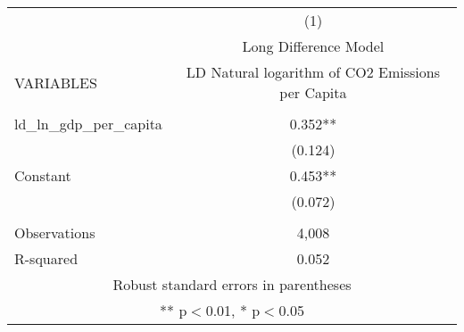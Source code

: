 \begin{tabular}{lc} \hline
 & (1) \\
 & Long Difference Model \\
VARIABLES & LD Natural logarithm of CO2 Emissions per Capita \\ \hline
 &  \\
ld\_ln\_gdp\_per\_capita & 0.352** \\
 & (0.124) \\
Constant & 0.453** \\
 & (0.072) \\
 &  \\
Observations & 4,008 \\
 R-squared & 0.052 \\ \hline
\multicolumn{2}{c}{ Robust standard errors in parentheses} \\
\multicolumn{2}{c}{ ** p$<$0.01, * p$<$0.05} \\
\end{tabular}
